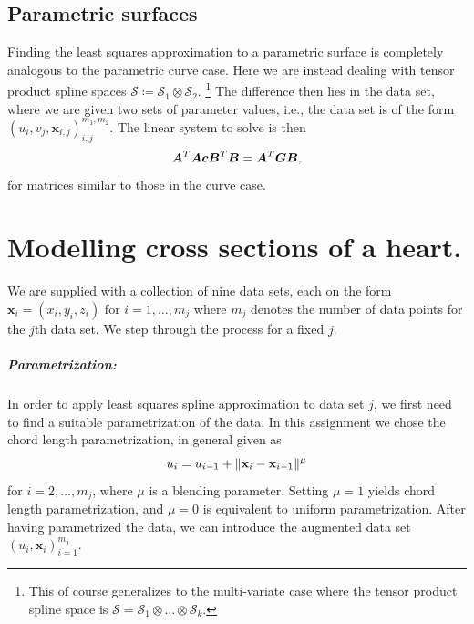 \documentclass[article]{memoir}
\newcommand{\x}{\mathbf{x}}
\renewcommand{\c}{\boldsymbol{c}}
\newcommand{\A}{\boldsymbol{A}}
\newcommand{\B}{\boldsymbol{B}}
\newcommand{\G}{\boldsymbol{G}}
\renewcommand{\S}{\mathcal{S}}
\begin{document}
\section{Parametric surfaces}

Finding the least squares approximation to a parametric surface is completely
analogous to the parametric curve case. Here we are instead dealing with tensor
product spline spaces \(\S \coloneqq \S_1 \otimes \S_2\).%
%
\footnote{This of course generalizes to the multi-variate case where the tensor
product spline space is \( \S = \S_1 \otimes \dots \otimes \S_k.\)}
%
The difference then lies in the data set, where we are given two sets of
parameter values, i.e., the data set is of the form \((u_i, v_j, \x_{i,j})_{i,
j}^{m_1, m_2}\). The linear system to solve is then
\begin{equation}
    \notag
    \A^T\A\c \B^T\B = \A^T\G\B, 
\end{equation}
for matrices similar to those in the curve case.

\chapter{Modelling cross sections of a heart.}
\label{sec:spline_representation_of_heart_contour_curves}

We are supplied with a collection of nine data sets, each on the form \(\x_i =
(x_i, y_i, z_i) \) for \( i = 1, \dots, m_j \) where \( m_j \) denotes the
number of data points for the \(j\)th data set. We step through the process
for a fixed \( j \).

\paragraph{Parametrization:}
In order to apply least squares spline approximation to data set \( j \), we
first need to find a suitable parametrization of the data. In this assignment
we chose the chord length parametrization, in general given as
\begin{equation}
    \notag
    u_i = u_{i-1} + \|\x_i - \x_{i-1}\|^\mu
\end{equation}
for \(i = 2, \dots, m_j\), where \( \mu \) is a blending parameter. Setting \(
\mu = 1 \) yields chord length parametrization, and \( \mu = 0 \) is equivalent
to uniform parametrization. After having parametrized the data, we can
introduce the augmented data set \( (u_i, \x_i) _{i = 1}^{m_j}\). 
\end{document}
